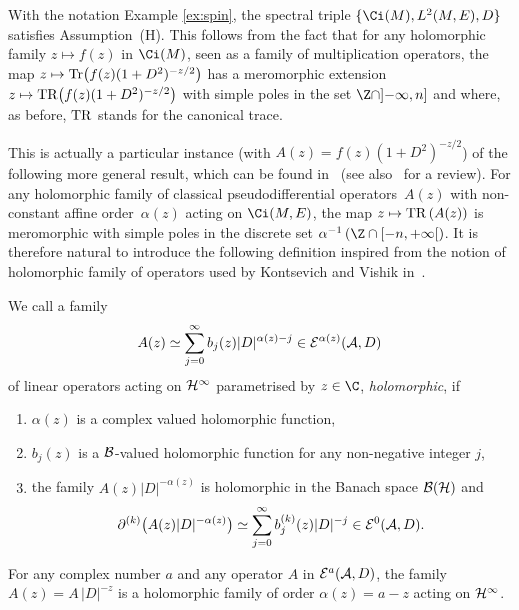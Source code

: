 \begin{example}
  With the notation Example \ref{ex:spin}, the spectral triple $\{\Ci(M), L^2(M, E), D\}$ sa\-tisf\/ies Assumption~(H). This follows from
  the fact that for any
  holomorphic family $z\mapsto f(z)$ in $\Ci(M)$, seen as a family of
  multiplication operators, the map $z\mapsto {\rm Tr}\big(f(z)   (1+
    D^2 )^{-z/2}\big)$ has a meromorphic extension  $z\mapsto {\rm TR}\big(f(z)   (1+
    D^2 )^{-z/2}\big)$ with simple poles in the set $ \Z\cap
]{-}\infty,n]$ and where, as before, ${\rm  TR}$ stands for the canonical
trace.
\end{example} This is actually a particular instance (with  $A(z)= f(z)   ( 1+
    D^2 )^{-z/2}$) of the following  more general result,
which can be found in~\cite{KV} (see also~\cite{Pa1} for a review). For any holomorphic family of classical pseudodif\/ferential
operators~$A(z)$ with non-constant af\/f\/ine order~$\alpha(z)$ acting on
$\Ci(M,E)$, the map  $z\mapsto {\rm TR}\left(A(z)\right)$ is meromorphic with
simple poles in the discrete set $\alpha^{-1}\left( \Z\cap   [{-}n, +\infty[\right)$. It is therefore natural to introduce
the following def\/inition  inspired from the notion of holomorphic family of
operators used by Kontsevich and Vishik in~\cite{KV}.

\begin{definition} \label{defn:holfamily}   We  call  a family
\begin{gather*}%
A(z)\simeq \sum_{j=0}^\infty b_j(z) \vert D\vert^{\alpha(z)-j}  \in {\cal E}^{\alpha(z)}({\cal A}, D)
\end{gather*}  of
linear  operators acting on ${\cal H}^\infty$  parametrised by $z\in \C$,
 {\it holomorphic}, if
\begin{enumerate}
\itemsep=0pt
\item[1)]    $\alpha(z)$  is a  complex valued  holomorphic function,
\item[2)]    $b_j(z)$  is a ${\cal B}$-valued holomorphic function for any  non-negative integer $j$,
\item[3)] the family $A(z)\vert D\vert^{-\alpha(z)}$ is holomorphic in the Banach space ${\cal B}({\cal H})$ and
\[
\partial^{(k)}\big(A(z)\vert D\vert^{-\alpha(z)}\big)\simeq  \sum_{j=0}^\infty b_j^{(k)}(z) \vert D\vert^{-j}  \in {\cal E}^{0}({\cal A}, D).
\]
\end{enumerate}
\end{definition}

\begin{example}\label{ex:1} For any complex number $a$ and any operator  $A$ in ${\cal E}^a({\cal A},D)$, the family $A(z)= A\, \vert D\vert^{-z}$ is   a holomorphic family of order
  $\alpha(z)=a-z$ acting on ${\cal H}^\infty$.
\end{example}

